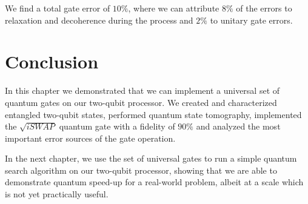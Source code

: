 We find a total gate error of $10 \%$, where we can attribute $8\%$ of the errors to relaxation and decoherence during the process and $2\%$ to unitary gate errors.

\section{Conclusion}

In this chapter we demonstrated that we can implement a universal set of quantum gates on our two-qubit processor. We created and characterized entangled two-qubit states, performed quantum state tomography, implemented the $\sqrt{iSWAP}$ quantum gate with a fidelity of $90\%$ and analyzed the most important error sources of the gate operation.

\smallskip

In the next chapter, we use the set of universal gates to run a simple quantum search algorithm on our two-qubit processor, showing that we are able to demonstrate quantum speed-up for a real-world problem, albeit at a scale which is not yet practically useful.